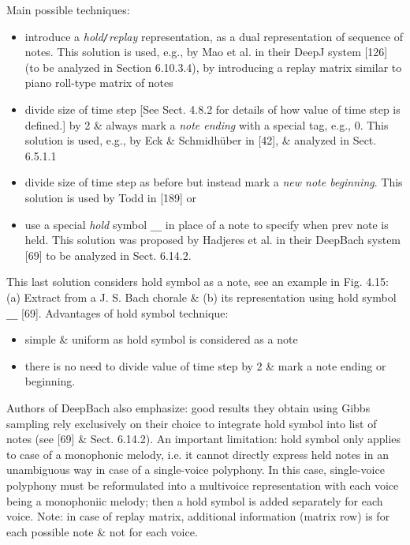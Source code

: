 \documentclass{article}
\begin{document}
\begin{itemize}
\begin{itemize}
\begin{itemize}
			Main possible techniques:
			\begin{itemize}
				\item introduce a {\it hold{\tt/}replay} representation, as a dual representation of sequence of notes. This solution is used, e.g., by Mao et al. in their DeepJ system [126] (to be analyzed in Section 6.10.3.4), by introducing a replay matrix similar to piano roll-type matrix of notes
				\item divide size of time step [See Sect. 4.8.2 for details of how value of time step is defined.] by 2 \& always mark a {\it note ending} with a special tag, e.g., 0. This solution is used, e.g., by {\sc Eck \& Schmidhüber} in [42], \& analyzed in Sect. 6.5.1.1
				\item divide size of time step as before but instead mark a {\it new note beginning}. This solution is used by {\sc Todd} in [189] or
				\item use a special {\it hold} symbol \verb|__| in place of a note to specify when prev note is held. This solution was proposed by Hadjeres et al. in their DeepBach system [69] to be analyzed in Sect. 6.14.2.
			\end{itemize}
			This last solution considers hold symbol as a note, see an example in {\sf Fig. 4.15: (a) Extract from a {\sc J. S. Bach} chorale \& (b) its representation using hold symbol \verb|__| [69].} Advantages of hold symbol technique:
			\begin{itemize}
				\item simple \& uniform as hold symbol is considered as a note
				\item there is no need to divide value of time step by 2 \& mark a note ending or beginning.
			\end{itemize}
			Authors of DeepBach also emphasize: good results they obtain using Gibbs sampling rely exclusively on their choice to integrate hold symbol into list of notes (see [69] \& Sect. 6.14.2). An important limitation: hold symbol only applies to case of a monophonic melody, i.e. it cannot directly express held notes in an unambiguous way in case of a single-voice polyphony. In this case, single-voice polyphony must be reformulated into a multivoice representation with each voice being a monophoniic melody; then a hold symbol is added separately for each voice. Note: in case of replay matrix, additional information (matrix row) is for each possible note \& not for each voice.


\end{itemize}
\end{itemize}
\end{itemize}
\end{document}

